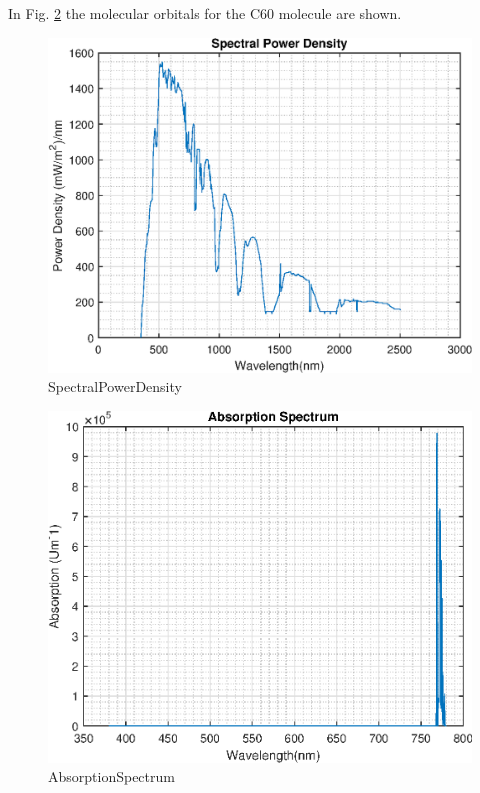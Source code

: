 \documentclass[%
 reprint,
 superscriptaddress,
 amsmath,amssymb,
pra,
]{revtex4-1}
\begin{document}
In Fig. \ref{fig:C60_molecular_orbitals} the molecular orbitals for the C60 molecule are shown. 

\begin{figure}[h]
    \centering
    \includegraphics[width=\columnwidth]{Figures_eps/SpectralPowerDensity.eps}
    \caption{SpectralPowerDensity}
    \label{fig:C60_molecular_orbitals}
\end{figure}

\begin{figure}[h]
    \centering
    \includegraphics[width=\columnwidth]{Figures_eps/AbsorptionSpectrum.eps}
    \caption{AbsorptionSpectrum}
    \label{fig:C60_molecular_orbitals}
\end{figure}
\end{document}
